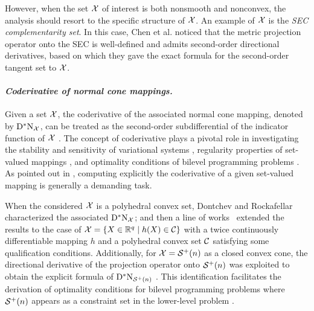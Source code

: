 However, when the set $\mathcal{X}$ of interest is both nonsmooth and nonconvex, the analysis should resort to the specific structure of $\mathcal{X}$. An example of $\mathcal{X}$ is the \emph{SEC complementarity set}. In this case, Chen et al. \cite{chen2019exactSOC} noticed that the metric projection operator onto the SEC is well-defined and admits second-order directional derivatives, based on which they gave the exact formula for the second-order tangent set to $\mathcal{X}$. 


\paragraph{\emph{\textbf{Coderivative of normal cone mappings.}}} Given a set $\mathcal{X}$, the coderivative of the associated normal cone mapping, denoted by $\mathrm{D}^*\mathrm{N}_{\mathcal{X}}$, can be treated as the second-order subdifferential of the indicator function of $\mathcal{X}$ \cite{mordukhovich2015secondvarconic}. The concept of coderivative plays a pivotal role in investigating the stability and sensitivity of variational systems \cite{poliquin1998tilt,dontchev2009implicitsolutionmappings}, regularity properties of set-valued mappings \cite{dontchev2009implicitsolutionmappings}, and optimality conditions of bilevel programming problems \cite{ding2014SDCMPCC,dempe2018optimality}. As pointed out in \cite{chieu2017coderivativeweakcondition}, computing explicitly the coderivative of a given set-valued mapping is generally a demanding task.

When the considered $\mathcal{X}$ is a polyhedral convex set, Dontchev and Rockafellar \cite{dontchev1996polyhedralconvex} characterized the associated $\mathrm{D}^*\mathrm{N}_{\mathcal{X}}$; and then a line of works~\cite{gfrerer2015weakest,gfrerer2016computationgeneralizedderivatives,chieu2017coderivativeweakcondition} extended the results to the case of $\mathcal{X}=\{X\in\mathbb{R}^q\mid h(X)\in\mathcal{C}\}$ with a twice continuously differentiable mapping $h$ and a polyhedral convex set $\mathcal{C}$ satisfying some qualification conditions. Additionally, for $\mathcal{X}=\mathcal{S}^+(n)$ as a closed convex cone, the directional derivative of the projection operator onto $\mathcal{S}^+(n)$ was exploited to obtain the explicit formula of $\mathrm{D}^*\mathrm{N}_{\mathcal{S}^+(n)}$ \cite{ding2014SDCMPCC,wu2014SDCMPCC}. This identification facilitates the derivation of optimality conditions for bilevel programming problems where $\mathcal{S}^+(n)$ appears as a constraint set in the lower-level problem \cite{dempe2018optimality}.


